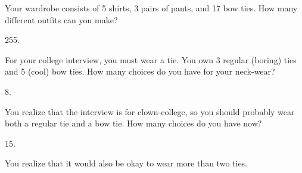 \begin{questions}

\question Your wardrobe consists of 5 shirts, 3 pairs of pants, and 17 bow ties.  How many different outfits can you make?

  \begin{answer}
    255.
  \end{answer}


  
\question For your college interview, you must wear a tie.  You own 3 regular (boring) ties and 5 (cool) bow ties.  How many choices do you have for your neck-wear? 

  \begin{answer}
    8.
  \end{answer}




\question You realize that the interview is for clown-college, so you should probably wear both a regular tie and a bow tie.  How many choices do you have now?

  \begin{answer}
    15.
  \end{answer}



\question You realize that it would also be okay to wear more than two ties.


\end{questions}

